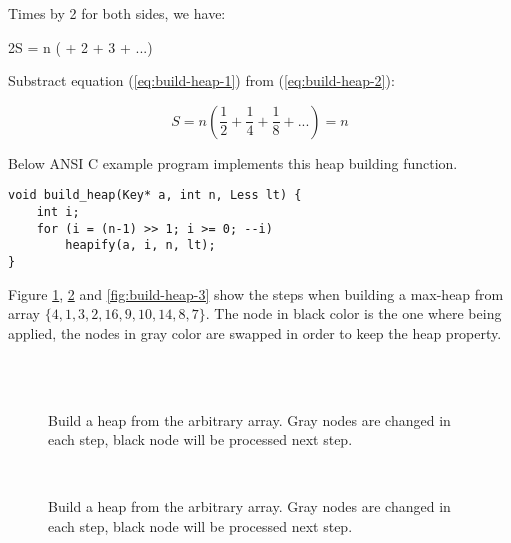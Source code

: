 \documentclass{article}
\begin{document}
Times by 2 for both sides, we have:

\be
2S = n ( + 2  + 3  + ...)
\label{eq:build-heap-2}
\ee

Substract equation (\ref{eq:build-heap-1}) from (\ref{eq:build-heap-2}):

\[
S = n (\frac{1}{2} + \frac{1}{4} + \frac{1}{8} + ...) = n
\]

Below ANSI C example program implements this heap building function.

\lstset{language=C}
\begin{lstlisting}
void build_heap(Key* a, int n, Less lt) {
    int i;
    for (i = (n-1) >> 1; i >= 0; --i)
        heapify(a, i, n, lt);
}
\end{lstlisting}

Figure \ref{fig:build-heap-1}, \ref{fig:build-heap-2} and \ref{fig:build-heap-3}
show the steps when building a max-heap from
array $\{4, 1, 3, 2, 16, 9, 10, 14, 8, 7\}$.
The node in black color is the one where  being
applied, the nodes in gray color are swapped in order to keep the heap property.

\begin{figure}[htbp]
    \centering
     \\
     \\
    \caption{Build a heap from the arbitrary array. Gray nodes are changed in each step,
black node will be processed next step.} \label{fig:build-heap-1}
\end{figure}

\begin{figure}[htbp]
    \centering
     \\
    \caption{Build a heap from the arbitrary array. Gray nodes are changed in each step,
black node will be processed next step.} \label{fig:build-heap-2}
\end{figure}
\end{document}

